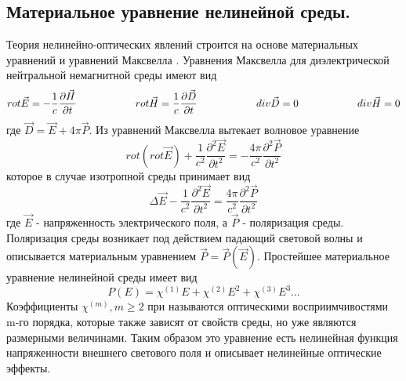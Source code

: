 \subsection{Материальное уравнение нелинейной среды.} 
\hspace*{2mm}
Теория нелинейно-оптических явлений строится на основе материальных уравнений и уравнений Максвелла  \cite{achmanov2}. Уравнения Максвелла для диэлектрической нейтральной немагнитной среды имеют вид
\begin{equation}\label{1:maxvel}
rot\vec{E} = - \frac{ 1 }{ c}\frac{\partial \vec{H} }{\partial t}
\hspace{20mm}
rot\vec{H} =  \frac{ 1 }{ c}\frac{\partial \vec{D} }{\partial t}
\hspace{20mm}
div\vec{D} = 0
\hspace{20mm}
div\vec{H} = 0
\end{equation}где $ \vec{D} = \vec{E} + 4\pi \vec{P}$. Из уравнений Максвелла вытекает волновое уравнение
\begin{equation}\label{1:rot_maxvel}
rot(rot\vec{E}) + \frac{ 1 }{ c^2 }\frac{\partial^2 \vec{E} }{\partial t^2} = - \frac{ 4\pi }{ c^2 }\frac{\partial^2 \vec{P} }{\partial t^2}
\end{equation}которое в случае изотропной среды принимает вид
\begin{equation}\label{1:wave_eq}
\Delta\vec{E} - \frac{ 1 }{ c^2 }\frac{\partial^2 \vec{E} }{\partial t^2} =  \frac{ 4\pi }{ c^2 }\frac{\partial^2 \vec{P} }{\partial t^2}
\end{equation}
где $\vec{E}$ - напряженность электрического поля, а $\vec{P}$ - поляризация среды. Поляризация среды возникает под действием падающий световой волны и описывается материальным уравнением $\vec{P} = \vec{P}(\vec{E})$. Простейшее материальное уравнение нелинейной среды имеет вид
\begin{equation}\label{1:p_1}
P(E) = \chi^{(1)}E + \chi^{(2)}E^2 +\chi^{(3)}E^3\dots
\end{equation}
Коэффициенты $\chi^{(m)}, m \ge 2$ при  называются оптическими восприимчивостями m-го порядка, которые также зависят от свойств среды, но уже являются размерными величинами. Таким образом это уравнение есть нелинейная функция напряженности внешнего светового поля и описывает нелинейные оптические эффекты. 

